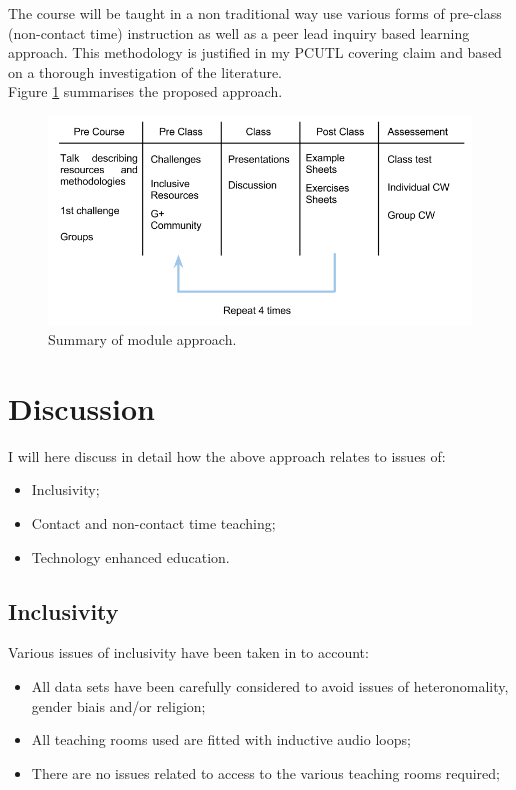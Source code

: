\documentclass[a4paper,12pt]{article}
\begin{document}
The course will be taught in a non traditional way use various forms of pre-class (non-contact time) instruction as well as a peer lead inquiry based learning approach. This methodology is justified in my PCUTL covering claim and based on a thorough investigation of the literature.\\

Figure \ref{Module_plan} summarises the proposed approach.

\begin{figure}[htdp]
    \begin{center}
        \includegraphics[width=12cm]{images/Module_plan.png}
    \end{center}
    \caption{Summary of module approach.}
    \label{Module_plan}
\end{figure}


\section{Discussion}
I will here discuss in detail how the above approach relates to issues of:

\begin{itemize}
    \item Inclusivity;
    \item Contact and non-contact time teaching;
    \item Technology enhanced education.
\end{itemize}

\subsection{Inclusivity}

Various issues of inclusivity have been taken in to account:

\begin{itemize}
    \item All data sets have been carefully considered to avoid issues of heteronomality, gender biais and/or religion;
    \item All teaching rooms used are fitted with inductive audio loops;
    \item There are no issues related to access to the various teaching rooms required;
\end{itemize}
\end{document}
